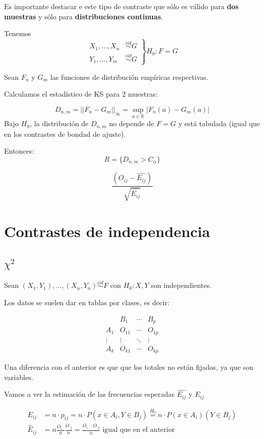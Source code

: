 Es importante destacar e este tipo de contraste que sólo es válido para \textbf{dos muestras} y sólo para \textbf{distribuciones continuas}.

Tenemos \[
\left.
\begin{array}{cc}
X_{1} ,...,X_{n} &\overset{iid}{\sim} G\\ 
Y_{1} ,...,Y_m &\overset{iid}{\sim}G
\end{array} \right\} H_0 : F = G
\]

Sean $F_n$ y $G_m$ las funciones de distribución empíricas respectivas.

Calculamos el estadístico de KS para 2 muestras:

\[
D_{n,m} = ||F_n - G_m ||_{\infty} = \sup_{a∈ℝ} | F_n(a) - G_m(a)|
\]
Bajo $H_0$, la distribución de $D_{n,m}$ no depende de $F=G$ y está tabulada (igual que en los contrastes de bondad de ajuste).

Entonces: \[R = \{ D_{n,m} > C_α\}\]
\begin{defn}
\[
\frac{(O_{ij}-\hat{E_{ij}})}{\sqrt{\hat{E_{ij}}}}
\]
\end{defn} 

\section{Contrastes de independencia}

\subsection{$\chi^2$}

Sean $(X_1,Y_1),...,(X_n,Y_n) \overset{iid}{\sim} F$ con $H_0 : X,Y$ son independientes.

Los datos se suelen dar en tablas por clases, es decir: 

\[
\begin{array}{c|ccc}
&B_1&\cdots & B_p \\\hline
A_1 & O_{11} & \cdots & O_{1p}\\
\vdots & \vdots & \ddots & \vdots \\
A_k & O_{k1} & \cdots & O_{kp} 
\end{array}
\]

Una diferencia con el anterior es que que los totales no están fijados, ya que son variables.

Vamos a ver la estimación de las frecuencias esperadas $\hat{E_{ij}}$ y $E_{ij}$

\begin{align*}
E_{ij} &= n·p_{ij} = n·P(x∈A_i,Y∈B_j) \overset{H_0}{=} n·P(x∈A_i)(Y∈B_j)\\
\hat{E}_{ij} &= n \frac{O_{i·}}{n}\frac{O_{·j}}{n} = \frac{O_{i·}·O_{·j}}{n} \text{ igual que en el anterior}
\end{align*}

